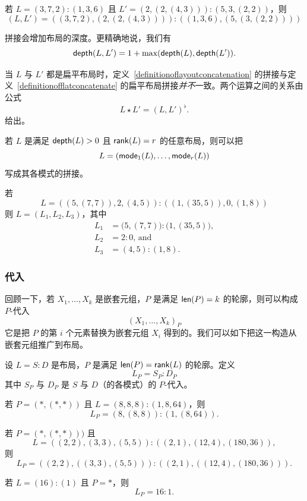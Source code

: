 \begin{example} \label{concatenationoflayoutsexample}
若 $L = (3,7,2):(1,3,6)$ 且 $L' = (2,(2,(4,3))):(5,3,(2,2))$，则
\[
(L,L') = ( (3,7,2), (2,(2,(4,3)))) : ( (1,3,6), (5,(3,(2,2))))
\]
\end{example}
\begin{remark}
    拼接会增加布局的深度。更精确地说，我们有
    \[
    \mathsf{depth}(L,L') = 1 + \text{max}(\mathsf{depth}(L),\mathsf{depth}(L')).
    \]
\end{remark}

\begin{remark}
    当 $L$ 与 $L'$ 都是扁平布局时，定义~\ref{definitionoflayoutconcatenation} 的拼接与定义~\ref{definitionofflatconcatenate} 的扁平布局拼接{\it 并不}一致。两个运算之间的关系由公式
    \[
    L \star L' = (L,L')^\flat.
    \]
    给出。
\end{remark}

\begin{remark}
    若 $L$ 是满足 $\mathsf{depth}(L)>0$ 且 $\mathsf{rank}(L) = r$ 的任意布局，则可以把
    \[
    L = (\mathsf{mode}_1(L),\dots,\mathsf{mode}_{r}(L))
    \]
    写成其各模式的拼接。
\end{remark}

\begin{example}
    若
    \[
    L = ((5,(7,7)),2,(4,5)):((1,(35,5)),0,(1,8))
    \]
    则 $L = (L_1,L_2,L_3)$，其中
    \begin{align*}
        L_1 & = \bigl(5,(7,7)\bigr) : \bigl(1,(35,5)\bigr),\\
        L_2 & = 2:0\text{, and }\\
        L_3 & = (4,5):(1,8).
    \end{align*}
\end{example}

\subsubsection{代入}
回顾一下，若 $X_1,\dots,X_k$ 是嵌套元组，$P$ 是满足 $\mathsf{len}(P) = k$ 的轮廓，则可以构成 $P$-代入
\[
(X_1,\dots,X_k)_P
\]
它是把 $P$ 的第 $i$ 个元素替换为嵌套元组 $X_i$ 得到的。我们可以如下把这一构造从嵌套元组推广到布局。

\begin{definition}
    设 $L = S:D$ 是布局，$P$ 是满足 $\mathsf{len}(P) = \mathsf{rank}(L)$ 的轮廓。定义
    \[
    L_P = S_P:D_P
    \]
    其中 $S_P$ 与 $D_P$ 是 $S$ 与 $D$（的各模式）的 $P$-代入。
\end{definition}

\begin{example}
    若 $P = (*,(*,*))$ 且 $L = (8,8,8):(1,8,64)$，则
    \[
    L_P = (8,(8,8)):(1,(8,64)).
    \]
\end{example}
\begin{example}
    若 $P = (*,(*,*)))$ 且
    \[L = ((2,2),(3,3),(5,5)):((2,1),(12,4),(180,36)),\]
    则
    \[
    L_P = ((2,2),((3,3),(5,5))):((2,1),((12,4),(180,36))).
    \]
\end{example}
\begin{example}
    若 $L = (16):(1)$ 且 $P = *$，则
    \[
    L_P = 16:1.
    \]
\end{example}


